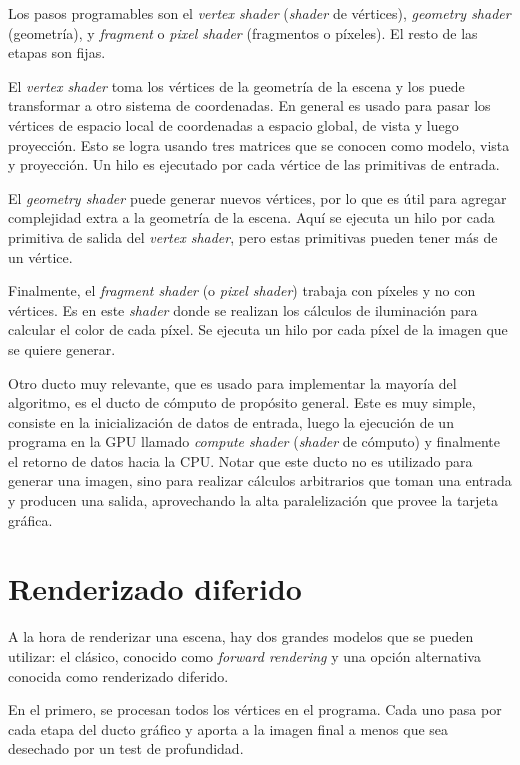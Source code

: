 Los pasos programables son el \textit{vertex shader} (\textit{shader} de vértices), \textit{geometry shader} (geometría), y \textit{fragment} o \textit{pixel shader} (fragmentos o píxeles).
El resto de las etapas son fijas.

El \textit{vertex shader} toma los vértices de la geometría de la escena y los puede transformar a otro sistema de coordenadas.
En general es usado para pasar los vértices de espacio local de coordenadas a espacio global, de vista y luego proyección.
Esto se logra usando tres matrices que se conocen como modelo, vista y proyección.
Un hilo es ejecutado por cada vértice de las primitivas de entrada.

El \textit{geometry shader} puede generar nuevos vértices, por lo que es útil para agregar complejidad extra a la geometría de la escena.
Aquí se ejecuta un hilo por cada primitiva de salida del \textit{vertex shader}, pero estas primitivas pueden tener más de un vértice.

Finalmente, el \textit{fragment shader} (o \textit{pixel shader}) trabaja con píxeles y no con vértices.
Es en este \textit{shader} donde se realizan los cálculos de iluminación para calcular el color de cada píxel.
Se ejecuta un hilo por cada píxel de la imagen que se quiere generar.

Otro ducto muy relevante, que es usado para implementar la mayoría del algoritmo, es el ducto de cómputo de propósito general.
Este es muy simple, consiste en la inicialización de datos de entrada, luego la ejecución de un programa en la GPU llamado \textit{compute shader} (\textit{shader} de cómputo) y finalmente el retorno de datos hacia la CPU.
Notar que este ducto no es utilizado para generar una imagen, sino para realizar cálculos arbitrarios que toman una entrada y producen una salida, aprovechando la alta paralelización que provee la tarjeta gráfica.

\section{Renderizado diferido}\label{sec:deferred-rendering}

A la hora de renderizar una escena, hay dos grandes modelos que se pueden utilizar: el clásico, conocido como \textit{forward rendering} y una opción alternativa conocida como renderizado diferido.

En el primero, se procesan todos los vértices en el programa.
Cada uno pasa por cada etapa del ducto gráfico y aporta a la imagen final a menos que sea desechado por un test de profundidad.

